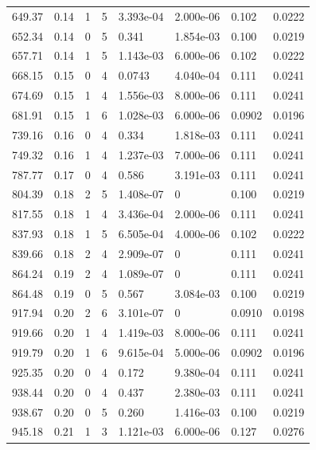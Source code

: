 \documentclass[preview]{standalone}
\begin{document}
{{\begin{tabular}{L{1.2cm}C{1.2cm} C{0.3cm}C{0.5cm} C{1.4cm}C{1.4cm} C{1.4cm}C{1.4cm}}
  649.37  &  0.14  & 1     &  5 &  3.393e-04  & 2.000e-06  & 0.102 &  0.0222   \\ 
  652.34  &  0.14  & 0     &  5 &  0.341  & 1.854e-03  & 0.100 &  0.0219   \\ 
  657.71  &  0.14  & 1     &  5 &  1.143e-03  & 6.000e-06  & 0.102 &  0.0222   \\ 
  668.15  &  0.15  & 0     &  4 &  0.0743  & 4.040e-04  & 0.111 &  0.0241   \\ 
  674.69  &  0.15  & 1     &  4 &  1.556e-03  & 8.000e-06  & 0.111 &  0.0241   \\ 
  681.91  &  0.15  & 1     &  6 &  1.028e-03  & 6.000e-06  & 0.0902 &  0.0196   \\ 
  739.16  &  0.16  & 0     &  4 &  0.334  & 1.818e-03  & 0.111 &  0.0241   \\ 
  749.32  &  0.16  & 1     &  4 &  1.237e-03  & 7.000e-06  & 0.111 &  0.0241   \\ 
  787.77  &  0.17  & 0     &  4 &  0.586  & 3.191e-03  & 0.111 &  0.0241   \\ 
  804.39  &  0.18  & 2     &  5 &  1.408e-07  & 0  & 0.100 &  0.0219   \\ 
  817.55  &  0.18  & 1     &  4 &  3.436e-04  & 2.000e-06  & 0.111 &  0.0241   \\ 
  837.93  &  0.18  & 1     &  5 &  6.505e-04  & 4.000e-06  & 0.102 &  0.0222   \\ 
  839.66  &  0.18  & 2     &  4 &  2.909e-07  & 0  & 0.111 &  0.0241   \\ 
  864.24  &  0.19  & 2     &  4 &  1.089e-07  & 0  & 0.111 &  0.0241   \\ 
  864.48  &  0.19  & 0     &  5 &  0.567  & 3.084e-03  & 0.100 &  0.0219   \\ 
  917.94  &  0.20  & 2     &  6 &  3.101e-07  & 0  & 0.0910 &  0.0198   \\ 
  919.66  &  0.20  & 1     &  4 &  1.419e-03  & 8.000e-06  & 0.111 &  0.0241   \\ 
  919.79  &  0.20  & 1     &  6 &  9.615e-04  & 5.000e-06  & 0.0902 &  0.0196   \\ 
  925.35  &  0.20  & 0     &  4 &  0.172  & 9.380e-04  & 0.111 &  0.0241   \\ 
  938.44  &  0.20  & 0     &  4 &  0.437  & 2.380e-03  & 0.111 &  0.0241   \\ 
  938.67  &  0.20  & 0     &  5 &  0.260  & 1.416e-03  & 0.100 &  0.0219   \\ 
  945.18  &  0.21  & 1     &  3 &  1.121e-03  & 6.000e-06  & 0.127 &  0.0276   \\ 

\end{tabular}}}
\end{document}
